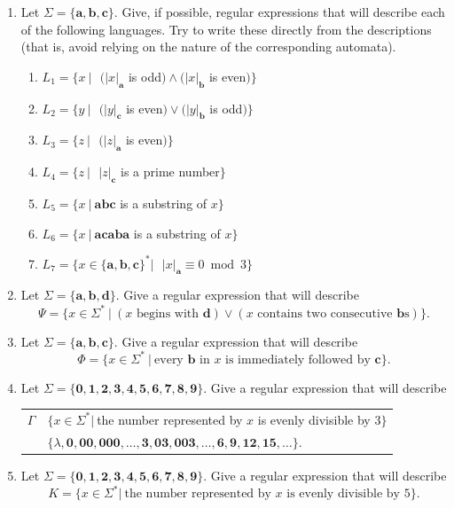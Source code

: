 \begin{enumerate}[{6.}1.]
\item Let $\Sigma=\{\pmb{a},\pmb{b},\pmb{c}\}$. Give, if possible, regular
expressions that will describe each of the following languages. Try to write
these directly from the descriptions (that is, avoid relying on the nature of
the corresponding automata).
\begin{enumerate}
\item $L_1 = \{x\ |\ \ \ (|x|_{\pmb{a}}$ is odd$)\wedge(|x|_{\pmb{b}}$ is even$)\}$
\item $L_2 = \{y\ |\ \ \ (|y|_{\pmb{c}}$ is even$)\vee(|y|_{\pmb{b}}$ is odd$)\}$
\item $L_3 = \{z\ |\ \ \ (|z|_{\pmb{a}}$ is even$)\}$
\item $L_4 = \{z\ |\ \ \ |z|_{\pmb{c}}$ is a prime number$\}$
\item $L_5 = \{x\ |\ \pmb{abc}$ is a substring of $x\}$
\item $L_6 = \{x\ |\ \pmb{acaba}$ is a substring of $x\}$
\item $L_7 = \{x \in \{\pmb{a},\pmb{b},\pmb{c}\}^*|\ \ \ |x|_{\pmb{a}} \equiv 0
	\bmod{3}\}$
\end{enumerate}

\item Let $\Sigma=\{\pmb{a},\pmb{b},\pmb{d}\}$. Give a regular expression that
will describe
\[ \Psi = \{x \in \Sigma^*\ |\ (x\text{ begins with }\pmb{d})\vee(x\text{ contains
	two consecutive $\pmb{b}$s})\}. \]

\item Let $\Sigma=\{\pmb{a},\pmb{b},\pmb{c}\}$. Give a regular expression that
will describe
\[ \Phi = \{x \in \Sigma^*\ |\ \text{every $\pmb{b}$ in $x$ is immediately followed
	by }\pmb{c}\}. \]

\item Let $\Sigma=\{\pmb{0},\pmb{1},\pmb{2},\pmb{3},\pmb{4},\pmb{5},\pmb{6},
\pmb{7},\pmb{8},\pmb{9}\}$. Give a regular expression that will describe
\begin{center}\begin{tabular}{r@{ = }l}
$\Gamma$ & $\{x \in \Sigma^*|\ $the number represented by $x$ is evenly
	divisible by $3\}$ \\
& $\{\lambda,\pmb{0},\pmb{00},\pmb{000},\ldots,\pmb{3},\pmb{03},\pmb{003},
	\ldots,\pmb{6},\pmb{9},\pmb{12},\pmb{15},\ldots\}$.
\end{tabular}\end{center}

\item Let $\Sigma = \{\pmb{0},\pmb{1},\pmb{2},\pmb{3},\pmb{4},\pmb{5},\pmb{6},
\pmb{7},\pmb{8},\pmb{9}\}$. Give a regular expression that will describe
\[ K = \{x \in \Sigma^*|\ \text{the number represented by $x$ is evenly divisible
	by }5\}. \]


\end{enumerate}
